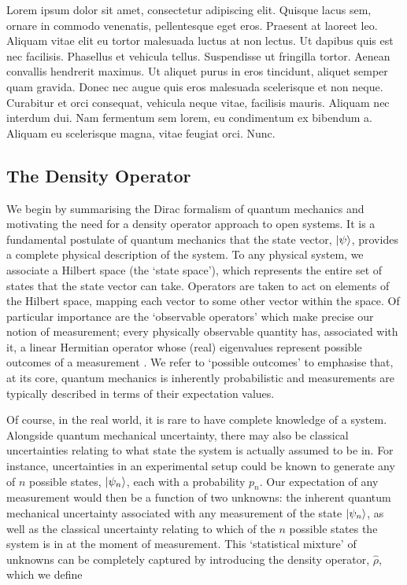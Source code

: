 \documentclass[11pt,a4paper]{article}
\numberwithin{equation}{section}
\begin{document}
	Lorem ipsum dolor sit amet, consectetur adipiscing elit. Quisque lacus sem, ornare in commodo venenatis, pellentesque eget eros. Praesent at laoreet leo. Aliquam vitae elit eu tortor malesuada luctus at non lectus. Ut dapibus quis est nec facilisis. Phasellus et vehicula tellus. Suspendisse ut fringilla tortor. Aenean convallis hendrerit maximus. Ut aliquet purus in eros tincidunt, aliquet semper quam gravida. Donec nec augue quis eros malesuada scelerisque et non neque. Curabitur et orci consequat, vehicula neque vitae, facilisis mauris. Aliquam nec interdum dui. Nam fermentum sem lorem, eu condimentum ex bibendum a. Aliquam eu scelerisque magna, vitae feugiat orci. Nunc.\color{black}
	
	
	\subsection{The Density Operator}
	\label{sec:densityop}
	We begin by summarising the Dirac formalism of quantum mechanics and motivating the need for a density operator approach to open systems. It is a fundamental postulate of quantum mechanics that the state vector, $\ket{\psi}$, provides a complete physical description of the system.  To any physical system, we associate a Hilbert space (the `state space'), which represents the entire set of states that the state vector can take. Operators are taken to act on elements of the Hilbert space, mapping each vector to some other vector within the space. Of particular importance are the `observable operators' which make precise our notion of measurement; every physically observable quantity has, associated with it, a linear Hermitian operator whose (real) eigenvalues represent possible outcomes of a measurement \cite{vonNeumann55}. We refer to `possible outcomes' to emphasise that, at its core, quantum mechanics is inherently probabilistic and measurements are typically described in terms of their expectation values.
	
	Of course, in the real world, it is rare to have complete knowledge of a system. Alongside quantum mechanical uncertainty, there may also be classical uncertainties relating to what state the system is actually assumed to be in. For instance, uncertainties in an experimental setup could be known to generate any of $n$ possible states, $\ket{\psi_n}$, each with a probability $p_n$. Our expectation of any measurement would then be a function of two unknowns: the inherent quantum mechanical uncertainty associated with any measurement of the state $\ket{\psi_n}$, as well as the classical uncertainty relating to which of the $n$ possible states the system is in at the moment of measurement. This `statistical mixture' of unknowns can be completely captured by introducing the density operator, $\hat{\rho}$, which we define \cite{Fano57}
	
\end{document}
